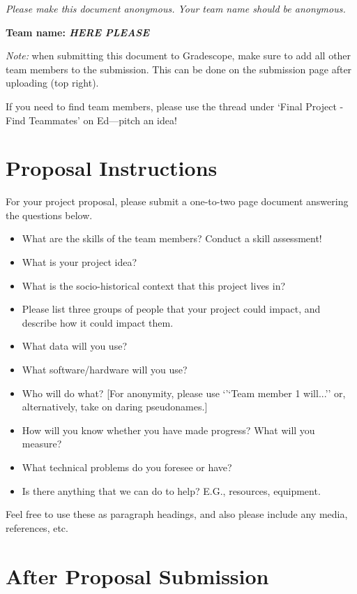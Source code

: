\emph{Please make this document anonymous. Your team name should be anonymous.}

\textbf{Team name: \emph{HERE PLEASE}}

\emph{Note:} when submitting this document to Gradescope, make sure to add all other team members to the submission. This can be done on the submission page after uploading (top right).

If you need to find team members, please use the thread under `Final Project - Find Teammates' on Ed---pitch an idea!

\section*{Proposal Instructions}

For your project proposal, please submit a one-to-two page document answering the questions below.

\begin{itemize}
  \item What are the skills of the team members? Conduct a skill assessment!
  \item What is your project idea?  
  \item What is the socio-historical context that this project lives in? 
  \item Please list three groups of people that your project could impact, and describe how it could impact them. 
  \item What data will you use?
  \item What software/hardware will you use?
  \item Who will do what? [For anonymity, please use `'`Team member 1 will...'' or, alternatively, take on daring pseudonames.]
  \item How will you know whether you have made progress? What will you measure?
  \item What technical problems do you foresee or have?
  \item Is there anything that we can do to help? E.G., resources, equipment.
\end{itemize}

Feel free to use these as paragraph headings, and also please include any media, references, etc.

\section*{After Proposal Submission}

